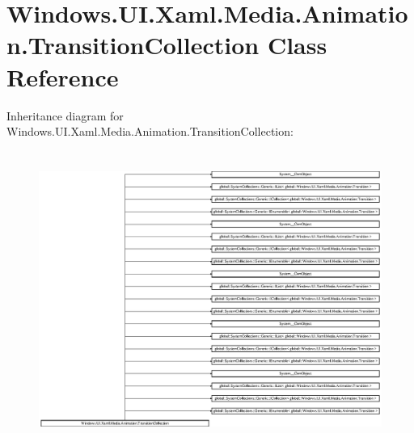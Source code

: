 \hypertarget{class_windows_1_1_u_i_1_1_xaml_1_1_media_1_1_animation_1_1_transition_collection}{}\section{Windows.\+U\+I.\+Xaml.\+Media.\+Animation.\+Transition\+Collection Class Reference}
\label{class_windows_1_1_u_i_1_1_xaml_1_1_media_1_1_animation_1_1_transition_collection}
Inheritance diagram for Windows.\+U\+I.\+Xaml.\+Media.\+Animation.\+Transition\+Collection\+:\begin{figure}[H]
\begin{center}
\leavevmode
\includegraphics[height=9.686985cm]{class_windows_1_1_u_i_1_1_xaml_1_1_media_1_1_animation_1_1_transition_collection}
\end{center}
\end{figure}
